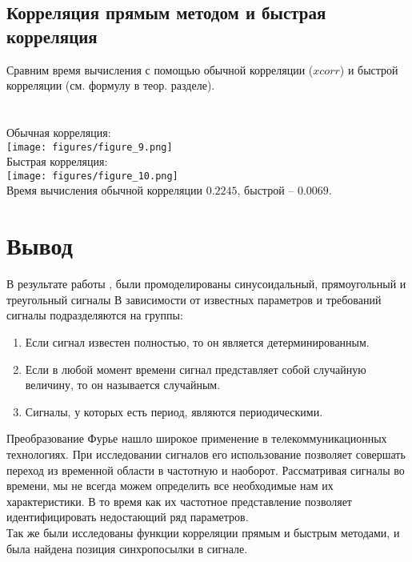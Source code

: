 \documentclass[a4paper]{article}
\begin{document}
\subsection{Корреляция прямым методом и быстрая корреляция}
Сравним время вычисления с помощью обычной корреляции ($xcorr$) и быстрой корреляции (см. формулу в теор. разделе).\\
\\
\\
Обычная корреляция:\\
\texttt{[image: figures/figure\_9.png]}\\
Быстрая корреляция:\\
\texttt{[image: figures/figure\_10.png]}\\
Время вычисления обычной корреляции $0.2245$, быстрой -- $0.0069$.\\
\newpage
\section{Вывод}
В результате работы , были промоделированы синусоидальный, прямоугольный и треугольный сигналы
В зависимости от известных параметров и требований сигналы подразделяются на группы:
\begin{enumerate}
    \item Если сигнал известен полностью, то он является детерминированным.
    \item Если в любой момент времени сигнал представляет собой случайную величину, то он называется случайным.
    \item Сигналы, у которых есть период, являются периодическими.
\end{enumerate}
Преобразование Фурье нашло широкое применение в телекоммуникационных технологиях. При исследовании сигналов его использование позволяет совершать переход из временной области в частотную и наоборот. Рассматривая сигналы во времени, мы не всегда можем определить все необходимые нам их характеристики. В то время как их частотное представление позволяет идентифицировать недостающий ряд параметров.\\
Так же были исследованы функции корреляции прямым и быстрым методами, и была найдена позиция синхропосылки в сигнале.
\end{document}
